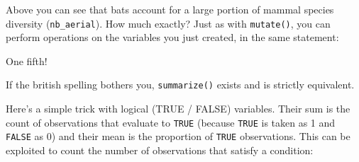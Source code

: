 \documentclass[]{book}
\newenvironment{Shaded}{}{}
\newcommand{\CommentTok}[1]{\textcolor[rgb]{0.38,0.63,0.69}{\textit{#1}}}
\newcommand{\DecValTok}[1]{\textcolor[rgb]{0.25,0.63,0.44}{#1}}
\newcommand{\KeywordTok}[1]{\textcolor[rgb]{0.00,0.44,0.13}{\textbf{#1}}}
\newcommand{\NormalTok}[1]{#1}
\newcommand{\OperatorTok}[1]{\textcolor[rgb]{0.40,0.40,0.40}{#1}}
\newcommand{\StringTok}[1]{\textcolor[rgb]{0.25,0.44,0.63}{#1}}
\begin{document}
Above you can see that bats account for a large portion of mammal species
diversity (\texttt{nb\_aerial}). How much exactly? Just as with \texttt{mutate()}, you can
perform operations on the variables you just created, in the same statement:

\begin{Shaded}
\end{Shaded}

One fifth!

If the british spelling bothers you, \texttt{summarize()} exists and is strictly
equivalent.

Here's a simple trick with logical (TRUE / FALSE) variables. Their sum is the
count of observations that evaluate to \texttt{TRUE} (because \texttt{TRUE} is taken as 1 and
\texttt{FALSE} as 0) and their mean is the proportion of \texttt{TRUE} observations. This can
be exploited to count the number of observations that satisfy a condition:

\begin{Shaded}
\end{Shaded}
\end{document}
